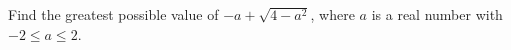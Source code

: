 Find the greatest possible value of $-a+\sqrt{4-a^2}$, where $a$ is a real number with $-2\le a\le2$.
